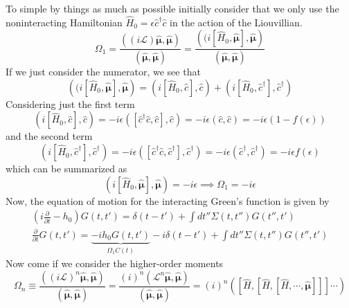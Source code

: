 To simple by things as much as possible initially consider that we only use the noninteracting Hamiltonian $\hat{H}_0= \epsilon \hat{c}^\dagger \hat{c}$ in the action of the Liouvillian.
\begin{equation}
    \Omega_1 = \frac{ \left( (i \mathcal{L}) \hat{\boldsymbol{\mu}}, \hat{\boldsymbol{\mu}} \right) }{ (\hat{\boldsymbol{\mu}}, \hat{\boldsymbol{\mu}}) } = \frac{ \left( (i [\hat{H}_0, \hat{\boldsymbol{\mu}}], \hat{\boldsymbol{\mu}} \right) }{ (\hat{\boldsymbol{\mu}}, \hat{\boldsymbol{\mu}}) }
\end{equation}
If we just consider the numerator, we see that
\begin{equation}
    \left( (i [\hat{H}_0, \hat{\boldsymbol{\mu}}], \hat{\boldsymbol{\mu}} \right) = \left( i [\hat{H}_0, \hat{c}], \hat{c} \right) + \left( i [\hat{H}_0, \hat{c}^\dagger], \hat{c}^\dagger \right)
\end{equation}
Considering just the first term
\begin{equation}
    \left( i [\hat{H}_0, \hat{c}], \hat{c} \right) = -i \epsilon ([\hat{c}^\dagger \hat{c}, \hat{c}] , \hat{c}) = -i \epsilon (\hat{c}, \hat{c}) = -i \epsilon\left(1-f(\epsilon)\right)
\end{equation}
and the second term
\begin{equation}
    \left( i [\hat{H}_0, \hat{c}^\dagger], \hat{c}^\dagger \right) = -i \epsilon ([\hat{c}^\dagger \hat{c}, \hat{c}^\dagger] , \hat{c}^\dagger) = -i \epsilon (\hat{c}^\dagger, \hat{c}^\dagger) = -i \epsilon f(\epsilon)
\end{equation}
which can be summarized as
\begin{equation}
    \left( i [\hat{H}_0, \hat{\boldsymbol{\mu}}], \hat{\boldsymbol{\mu}} \right) = -i \epsilon \implies \Omega_1 = -i \epsilon
\label{eq:Omega1}
\end{equation}
Now, the equation of motion for the interacting Green's function is given by
\begin{align}
    \left(i\frac{\partial}{\partial t} - h_0\right)G(t,t') = \delta(t-t') + \int dt'' \Sigma(t,t'')G(t'',t') \\
    \frac{\partial}{\partial t} G(t,t') = \underbrace{-ih_0 G(t,t')}_{\Omega_1 C(t)} -i \delta(t-t') + \int dt'' \Sigma(t,t'')G(t'',t')
\end{align}
Now come if we consider the higher-order moments
\begin{equation}
\Omega_{n} \equiv \frac{\left((i \mathcal{L})^{n} \hat{\boldsymbol{\mu}}, \hat{\boldsymbol{\mu}}\right)}{(\hat{\boldsymbol{\mu}}, \hat{\boldsymbol{\mu}})} = \frac{(i)^n \left( \mathcal{L}^{n} \hat{\boldsymbol{\mu}}, \hat{\boldsymbol{\mu}}\right)}{(\hat{\boldsymbol{\mu}}, \hat{\boldsymbol{\mu}})} = (i)^n \left( [\hat{H},[\hat{H},[\hat{H}, \cdots, \hat{\boldsymbol{\mu}}]]] \cdots \right)
\end{equation}

